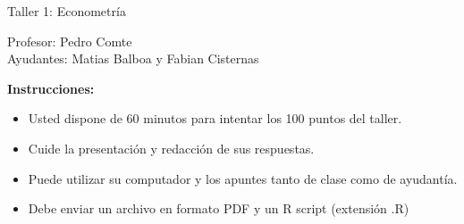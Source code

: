 \documentclass[letterpaper,11pt]{article}
\begin{document}
\begin{center}
    {\Large  Taller 1: Econometría }

Profesor:    Pedro Comte\\
Ayudantes: Matias Balboa y Fabian Cisternas

\end{center}

\textbf{Instrucciones:} 

\begin{itemize}
    \item Usted dispone de 60 minutos  para intentar los 100 puntos del taller.
    \item Cuide la presentación y redacción de sus respuestas.
    \item Puede utilizar su computador y los apuntes tanto de clase como de ayudantía.
    \item Debe enviar un archivo en formato PDF y un R script (extensión .R)
\end{itemize}
\end{document}
